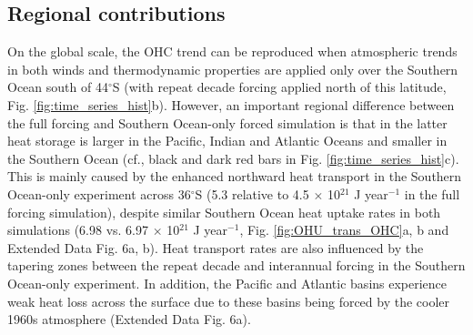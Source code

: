 \documentclass{nature}
\begin{document}
	\subsection{Regional contributions}
	On the global scale, the OHC trend can be reproduced when atmospheric trends in both winds and thermodynamic properties are applied only over the Southern Ocean south of 44$^{\circ}$S (with repeat decade forcing applied north of this latitude, Fig. \ref{fig:time_series_hist}b). However, an important regional difference between the full forcing and Southern Ocean-only forced simulation is that in the latter heat storage is larger in the Pacific, Indian and Atlantic Oceans and smaller in the Southern Ocean (cf., black and dark red bars in Fig. \ref{fig:time_series_hist}c). This is mainly caused by the enhanced northward heat transport in the Southern Ocean-only experiment across 36$^{\circ}$S (5.3 relative to 4.5 $\times$ 10$^{21}$ J year$^{-1}$ in the full forcing simulation), despite similar Southern Ocean heat uptake rates in both simulations (6.98 vs. 6.97 $\times$ 10$^{21}$ J year$^{-1}$, Fig. \ref{fig:OHU_trans_OHC}a, b and Extended Data Fig. 6a, b). Heat transport rates are also influenced by the tapering zones between the repeat decade and interannual forcing in the Southern Ocean-only experiment. In addition, the Pacific and Atlantic basins experience weak heat loss across the surface due to these basins being forced by the cooler 1960s atmosphere (Extended Data Fig. 6a).
	
\end{document}
